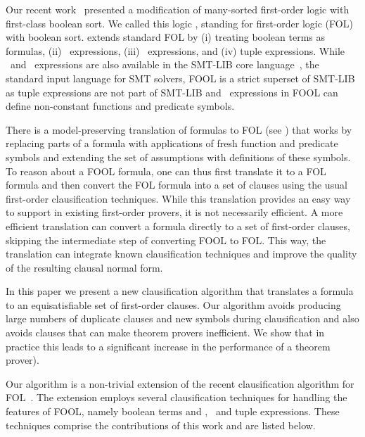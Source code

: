 Our recent work~\cite{FOOL} presented a modification of many-sorted first-order logic with first-class boolean sort. We called this logic \folb{}, standing for first-order logic (FOL) with boolean sort. \folb{} extends standard FOL by (i) treating boolean terms as formulas, (ii) \ITE\ expressions, (iii) \LETIN\ expressions, and (iv) tuple expressions. While \ITE\ and \LETIN\ expressions are also available in the SMT-LIB core language~\cite{BarFT-SMTLIB}, the standard input language for SMT solvers, FOOL is a strict superset of SMT-LIB as tuple expressions are not part of SMT-LIB and \LETIN\ expressions in FOOL can define non-constant functions and predicate symbols. 

There is a model-preserving translation of \folb{} formulas to FOL (see \cite{FOOL})
that works by replacing parts of a \folb{} formula with applications of fresh function and predicate symbols and extending the set of assumptions with definitions of these symbols.
To reason about a FOOL formula, one can thus 
first translate it to a FOL formula and then convert the FOL formula into a set of clauses
using the usual first-order clausification techniques. 
While this translation provides an easy way to support \folb{} in existing first-order provers,
it is not necessarily efficient.
A more efficient translation can convert a \folb{} formula directly to a set of first-order clauses, skipping the intermediate step of converting FOOL to FOL. This way, the translation can integrate known clausification techniques and improve the quality of the resulting clausal normal form. 

In this paper  we present a new clausification algorithm \nfcnf{} that translates a \folb{} formula to an equisatisfiable set of first-order clauses. 
Our algorithm 
avoids producing large numbers  of duplicate clauses and new symbols during clausification and 
also avoids clauses that can make theorem provers inefficient.
We show that in practice this leads to a significant increase in the performance of a theorem prover).

Our \nfcnf{} algorithm  is a non-trivial  extension of the recent \newcnf{} clausification algorithm for FOL~\cite{newcnf_fol}. The extension employs several clausification techniques for handling the features of FOOL, namely boolean terms and \ITE, \LETIN\ and tuple expressions. These techniques comprise the contributions of this work and are listed below.

